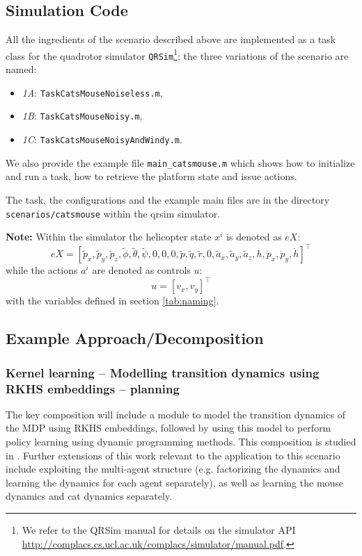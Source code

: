 \documentclass{article}
\newcommand\mytexttt[1]{\texttt{\hyphenchar\font=45\relax #1}}
\newcommand{\webman}{\url{http://complacs.cs.ucl.ac.uk/complacs/simulator/manual.pdf}\xspace}
\begin{document}
\subsection{Simulation Code}\label{CatMouseSim}
All the ingredients of the scenario described above are implemented as a task class for the quadrotor simulator \texttt{QRSim}\footnote{We refer to the QRSim manual for details on the simulator API \webman.}; the three variations of the scenario are named:
\begin{itemize}
\item\textit{1A}: \mytexttt{TaskCatsMouseNoiseless.m},
\item\textit{1B}: \mytexttt{TaskCatsMouseNoisy.m},
\item\textit{1C}: \mytexttt{TaskCatsMouseNoisyAndWindy.m}. 
\end{itemize}

We also provide the example file \texttt{main\_catsmouse.m} which shows how to initialize and run a task, how to retrieve the platform state
and issue actions.

The task, the configurations and the example main files are in the directory \mytexttt{scenarios/catsmouse} within the qrsim simulator. 

\textbf{Note:}
Within the simulator the helicopter state $x^i$ is denoted as $eX$:
$$eX = [\tilde{p}_x,\tilde{p}_y,\tilde{p}_z,\tilde{\phi},\tilde{\theta},\tilde{\psi},0,0,0,\tilde{p},\tilde{q},\tilde{r},0,\tilde{a}_x,\tilde{a}_y,\tilde{a}_z,h,\dot{p}_x,\dot{p}_y,\dot{h}]^\intercal$$
while the actions $a^i$ are denoted as controls $u$:
$$u=[v_x,v_y]^\intercal$$
with the variables defined in section \ref{tab:naming}.

\subsection{Example Approach/Decomposition} \label{CatMouseDecompositions}

\subsubsection{Kernel learning -- Modelling transition dynamics using RKHS embeddings -- planning} \label{EmbeddingsDecomp}

The key composition will include a module to model the transition dynamics of the MDP using RKHS embeddings, followed by using this model to perform policy learning using dynamic programming methods. This composition is studied in \cite{GrunewalderEmbeddingsMDPs}. Further extensions of this work relevant to the application to this scenario include exploiting the multi-agent structure (e.g. factorizing the dynamics and learning the dynamics for each agent separately), as well as learning the mouse dynamics and cat dynamics separately.
\end{document}
